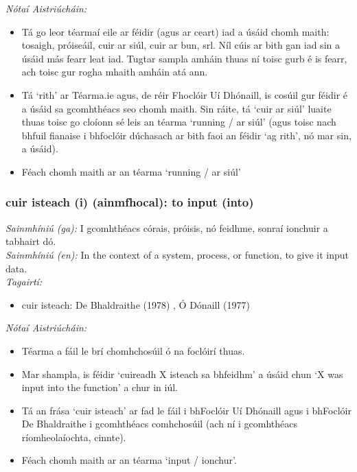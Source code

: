  \noindent \textit{Nótaí Aistriúcháin:}
\begin{itemize}
	\item Tá go leor téarmaí eile ar féidir (agus ar ceart) iad a úsáid chomh maith: tosaigh, próiseáil, cuir ar siúl, cuir ar bun, srl. Níl cúis ar bith gan iad sin a úsáid más fearr leat iad. Tugtar sampla amháin thuas ní toisc gurb é is fearr, ach toisc gur rogha mhaith amháin atá ann.
	\item Tá `rith' ar Téarma.ie agus, de réir Fhoclóir Uí Dhónaill, is cosúil gur féidir é a úsáid sa gcomhthéacs seo chomh maith. Sin ráite, tá `cuir ar siúl' luaite thuas toisc go cloíonn sé leis an téarma `running / ar siúl' (agus toisc nach bhfuil fianaise i bhfoclóir dúchasach ar bith faoi an féidir `ag rith', nó mar sin, a úsáid).
	\item Féach chomh maith ar an téarma `running / ar siúl'
\end{itemize}


\subsubsection*{cuir isteach (i) (ainmfhocal): to input (into)}
 \noindent \textit{Sainmhíniú (ga):} I gcomhthéacs córais, próisis, nó feidhme, sonraí ionchuir a tabhairt dó.
\\
 \noindent \textit{Sainmhíniú (en):} In the context of a system, process, or function, to give it input data.
\\
 \noindent \textit{Tagairtí:}
\begin{itemize}
	\item cuir isteach: De Bhaldraithe (1978) \cite{de-bhaldraithe}, Ó Dónaill (1977) \cite{odonaill}
\end{itemize}

 \noindent \textit{Nótaí Aistriúcháin:}
\begin{itemize}
	\item Téarma a fáil le brí chomhchosúil ó na foclóirí thuas.
	\item Mar shampla, is féidir `cuireadh X isteach sa bhfeidhm' a úsáid chun `X was input into the function' a chur in iúl.
	\item Tá an frása `cuir isteach' ar fad le fáil i bhFoclóir Uí Dhónaill agus i bhFoclóir De Bhaldraithe i gcomhthéacs comhchosúil (ach ní i gcomhthéacs ríomheolaíochta, cinnte).
	\item Féach chomh maith ar an téarma `input / ionchur'.
\end{itemize}


